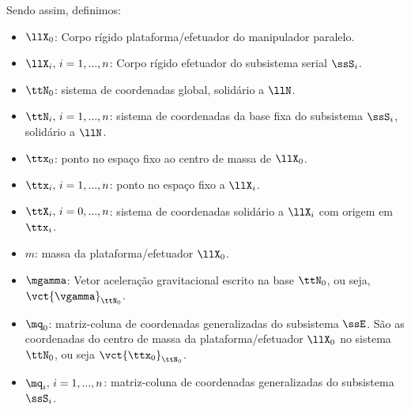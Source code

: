 \documentclass[]{politex}
\begin{document}
Sendo assim, definimos:
\begin{itemize}
\item $\llX_0$: Corpo rígido plataforma/efetuador do manipulador paralelo.
\item $\llX_i, \, i=1,...,n$: Corpo rígido efetuador do subsistema serial $\ssS_i$.
\item $\ttN_0$: sistema de coordenadas global, solidário a $\llN$.
\item $\ttN_i, \, i=1,...,n$: sistema de coordenadas da base fixa do subsistema $\ssS_i$, solidário a $\llN$.
\item $\ttx_0$: ponto no espa\c{c}o fixo ao centro de massa de $\llX_0$.
\item $\ttx_i, \,i=1, ..., n$: ponto no espa\c{c}o fixo a $\llX_i$.
\item $\ttX_i, \,i=0, ..., n$: sistema de coordenadas solidário a $\llX_i$ com origem em $\ttx_i$.
\item $m$: massa da plataforma/efetuador $\llX_0$.
\item $\mgamma$: Vetor aceleração gravitacional escrito na base $\ttN_0$, ou seja, $\vct{\vgamma}_{\ttN_0}$.
\item $\mq_0$: matriz-coluna de coordenadas generalizadas do subsistema $\ssE$. São as coordenadas do centro de massa da plataforma/efetuador $\llX_0$ no sistema $\ttN_0$, ou seja $\vct{\ttx_0}_{\ttN_0}$.
\item $\mq_i, \,i=1, ..., n$: matriz-coluna de coordenadas generalizadas do subsistema $\ssS_i$.

\end{itemize}
\end{document}
